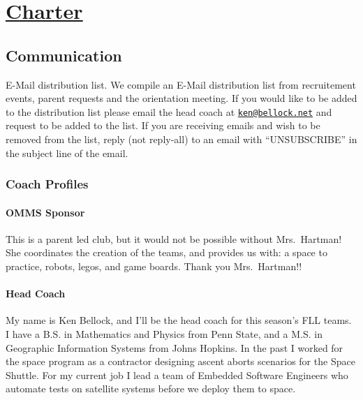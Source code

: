 \hypertarget{charter}{%
\section{\texorpdfstring{\href{../README.md}{Charter}}{Charter}}\label{charter}}

\hypertarget{communication}{%
\subsection{Communication}\label{communication}}

E-Mail distribution list. We compile an E-Mail distribution list from
recruitement events, parent requests and the orientation meeting. If you
would like to be added to the distribution list please email the head
coach at \href{mailto:ken@bellock.net}{\nolinkurl{ken@bellock.net}} and
request to be added to the list. If you are receiving emails and wish to
be removed from the list, reply (not reply-all) to an email with
``UNSUBSCRIBE'' in the subject line of the email.

\hypertarget{coach-profiles}{%
\subsubsection{Coach Profiles}\label{coach-profiles}}

\hypertarget{omms-sponsor}{%
\paragraph{OMMS Sponsor}\label{omms-sponsor}}

This is a parent led club, but it would not be possible without
Mrs.~Hartman! She coordinates the creation of the teams, and provides us
with: a space to practice, robots, legos, and game boards. Thank you
Mrs.~Hartman!!

\hypertarget{head-coach}{%
\paragraph{Head Coach}\label{head-coach}}

My name is Ken Bellock, and I'll be the head coach for this season's FLL
teams. I have a B.S. in Mathematics and Physics from Penn State, and a
M.S. in Geographic Information Systems from Johns Hopkins. In the past I
worked for the space program as a contractor designing ascent aborts
scenarios for the Space Shuttle. For my current job I lead a team of
Embedded Software Engineers who automate tests on satellite systems
before we deploy them to space.

